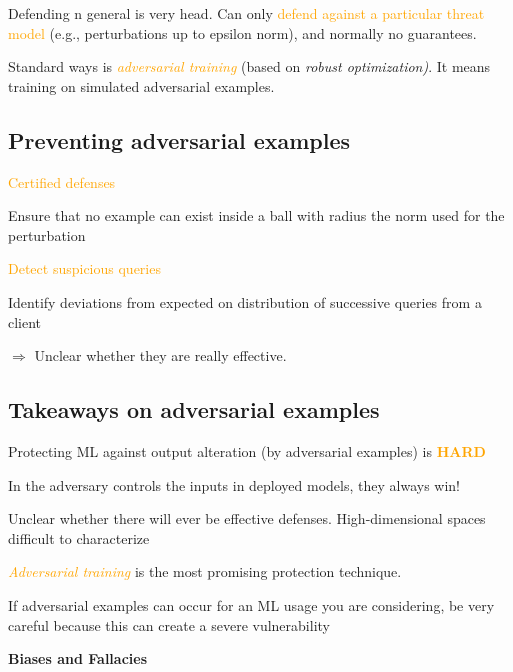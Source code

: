\documentclass[11pt]{article}
\begin{document}
Defending n general is very head. Can only \textcolor{orange}{defend against a particular threat model} (e.g., perturbations up to epsilon norm), and normally no guarantees. 

Standard ways is \textit{\textcolor{orange}{adversarial training}} (based on \textit{robust optimization)}. It means training on simulated adversarial examples. 

\subsection*{Preventing adversarial examples}

\textcolor{orange}{Certified defenses}

Ensure that no example can exist inside a ball with radius the norm used for the perturbation

\textcolor{orange}{Detect suspicious queries}

Identify deviations from expected on distribution of successive queries from a client

$\Rightarrow$ Unclear whether they are really effective.

\subsection{Takeaways on adversarial examples}

Protecting ML against output alteration (by adversarial examples) is \textbf{\textcolor{orange}{HARD}}

In the adversary controls the inputs in deployed models, they always win! 

Unclear whether there will ever be effective defenses. High-dimensional spaces difficult to characterize

\textit{\textcolor{orange}{Adversarial training}} is the most promising protection technique. 

\begin{tcolorbox}[
  colback=orange!15,     %
  colframe=black!50,    %
  boxrule=1pt,       %
  arc=3mm,             %
  left=4mm, right=4mm, top=2mm, bottom=2mm %
]
If adversarial examples can occur for an ML usage you are considering, be very careful because this can create a severe vulnerability
\end{tcolorbox}

\vspace{0.5cm}

\begin{center}
  {\LARGE \textbf{Biases and Fallacies}}
\end{center}
\vspace{0.5cm}
\end{document}
